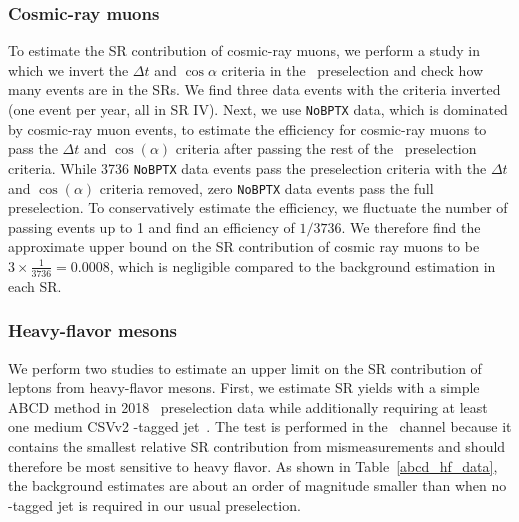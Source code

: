 

\subsubsection{Cosmic-ray muons}
To estimate the SR contribution of cosmic-ray muons, we perform a study in which we invert the $\Delta t$ and $\cos{\alpha}$ criteria in the \Pgm\Pgm\ preselection and check how many events are in the SRs. We find three data events with the criteria inverted (one event per year, all in SR IV). Next, we use \texttt{NoBPTX} data, which is dominated by cosmic-ray muon events, to estimate the efficiency for cosmic-ray muons to pass the $\Delta t$ and $\cos{(\alpha)}$ criteria after passing the rest of the \Pgm\Pgm\ preselection criteria. While \num{3736} \texttt{NoBPTX} data events pass the preselection criteria with the $\Delta t$ and $\cos{(\alpha)}$ criteria removed, zero \texttt{NoBPTX} data events pass the full preselection. To conservatively estimate the efficiency, we fluctuate the number of passing events up to 1 and find an efficiency of $1/3736$. We therefore find the approximate upper bound on the SR contribution of cosmic ray muons to be $3\times\frac{1}{3736}=0.0008$, which is negligible compared to the background estimation in each SR.

\subsubsection{Heavy-flavor mesons}
We perform two studies to estimate an upper limit on the SR contribution of leptons from heavy-flavor mesons. First, we estimate SR yields with a simple ABCD method in 2018 \Pgm\Pgm\ preselection data while additionally requiring at least one medium CSVv2 \PQb-tagged jet~\cite{bjet_identification}. The test is performed in the \Pgm\Pgm\ channel because it contains the smallest relative SR contribution from mismeasurements and should therefore be most sensitive to heavy flavor. As shown in Table~\ref{abcd_hf_data}, the background estimates are about an order of magnitude smaller than when no \PQb-tagged jet is required in our usual preselection.



